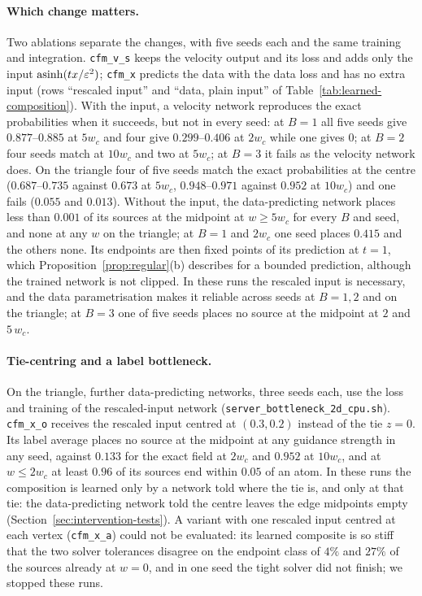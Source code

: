 \documentclass{article} %
\theoremstyle{plain}
\theoremstyle{definition}
\theoremstyle{remark}
\begin{document}
\paragraph{Which change matters.} Two ablations separate the changes, with five seeds each and
the same training and integration. \texttt{cfm\_v\_s} keeps the velocity output and its loss and
adds only the input $\operatorname{asinh}(tx/\varepsilon^2)$; \texttt{cfm\_x} predicts the data with the
data loss and has no extra input (rows ``rescaled input'' and ``data, plain input'' of
Table~\ref{tab:learned-composition}). With the input, a velocity network reproduces the exact
probabilities when it succeeds, but not in every seed: at $B=1$ all five seeds give
$0.877$--$0.885$ at $5w_c$ and four give $0.299$--$0.406$ at $2w_c$ while one gives $0$; at $B=2$
four seeds match at $10w_c$ and two at $5w_c$; at $B=3$ it fails as the velocity network does.
On the triangle four of five seeds match the exact probabilities at the centre ($0.687$--$0.735$ against
$0.673$ at $5w_c$, $0.948$--$0.971$ against $0.952$ at $10w_c$) and one fails
($0.055$ and $0.013$).
Without the input, the data-predicting network places less than $0.001$ of its sources at the
midpoint at $w\ge5w_c$ for every $B$ and seed, and none at any $w$ on the triangle; at $B=1$ and $2w_c$ one seed places $0.415$ and the
others none. Its endpoints are then fixed points of its prediction at $t=1$, which
Proposition~\ref{prop:regular}(b) describes for a bounded prediction, although the trained network
is not clipped. In these runs the rescaled input is necessary, and the data parametrisation makes
it reliable across seeds at $B=1,2$ and on the triangle; at $B=3$ one of five seeds places no source
at the midpoint at $2$ and $5\,w_c$.

\paragraph{Tie-centring and a label bottleneck.}
\label{apx:bottleneck-runs}
On the triangle, further data-predicting networks, three seeds each, use the loss and training of
the rescaled-input network (\texttt{server\_bottleneck\_2d\_cpu.sh}). \texttt{cfm\_x\_o} receives the
rescaled input centred at $(0.3,0.2)$ instead of the tie $z=0$. Its label average places no source
at the midpoint at any guidance strength in any seed, against $0.133$ for the exact field at $2w_c$
and $0.952$ at $10w_c$, and at $w\le2w_c$ at least $0.96$ of its sources end within $0.05$ of an
atom. In these runs the composition is learned only by a network told where the tie is, and only
at that tie: the data-predicting network told the centre leaves the edge midpoints empty
(Section~\ref{sec:intervention-tests}). A
variant with one rescaled input centred at each vertex (\texttt{cfm\_x\_a}) could not be
evaluated: its learned composite is so stiff that the two solver tolerances disagree on the
endpoint class of $4\%$ and $27\%$ of the sources already at $w=0$, and in one seed the tight solver
did not finish; we stopped these runs.
\end{document}
